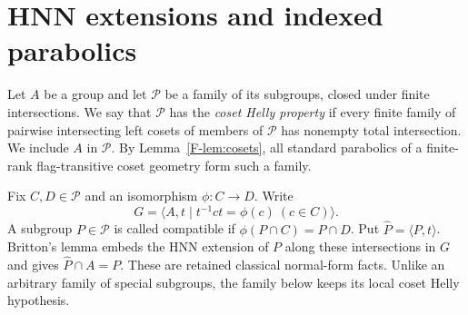 \section{HNN extensions and indexed parabolics}\label{sec:hnn}


Let $A$ be a group and let $\mathcal P$ be a family of its subgroups,
closed under finite intersections. We say that $\mathcal P$ has the
\emph{coset Helly property} if every finite family of pairwise intersecting
left cosets of members of $\mathcal P$ has nonempty total intersection.
We include $A$ in $\mathcal P$. By Lemma~\ref{F-lem:cosets}, all standard parabolics of a finite-rank flag-transitive coset geometry form such a family.

Fix $C,D\in\mathcal P$ and an isomorphism $\phi:C\longrightarrow D$.
Write
\[
 G=\langle A,t\mid t^{-1}ct=\phi(c)\ (c\in C)\rangle.
\]
A subgroup $P\in\mathcal P$ is called compatible if
$\phi(P\cap C)=P\cap D$. Put $\widehat P=\langle P,t\rangle$.
Britton's lemma embeds the HNN extension of $P$ along these intersections
in $G$ and gives $\widehat P\cap A=P$. These are retained classical
normal-form facts. Unlike an arbitrary family of special subgroups, the
family below keeps its local coset Helly hypothesis.

